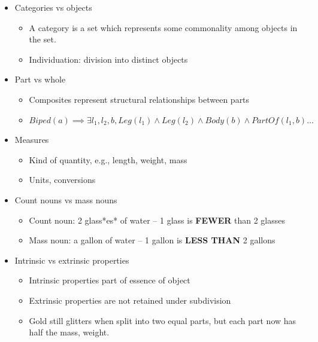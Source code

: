 \documentclass[11pt]{article}
\begin{document}
\begin{itemize}
\item Categories vs objects

\begin{itemize}
\item A category is a set which represents some commonality among objects in the set.
\item Individuation: division into distinct objects
\end{itemize}

\item Part vs whole

\begin{itemize}
\item Composites represent structural relationships between parts
\item \(Biped(a) \implies \exists l_1, l_2, b, Leg(l_1) \land Leg(l_2) \land Body(b) \land PartOf(l_1, b) \dots\)
\end{itemize}

\item Measures

\begin{itemize}
\item Kind of quantity, e.g., length, weight, mass
\item Units, conversions
\end{itemize}

\item Count nouns vs mass nouns

\begin{itemize}
\item Count noun: 2 glass*es* of water -- 1 glass is \textbf{FEWER} than 2 glasses

\item Mass noun: a gallon of water -- 1 gallon is \textbf{LESS THAN} 2 gallons
\end{itemize}

\item Intrinsic vs extrinsic properties

\begin{itemize}
\item Intrinsic properties part of essence of object
\item Extrinsic properties are not retained under subdivision
\item Gold still glitters when split into two equal parts, but each part now has half the mass, weight.
\end{itemize}
\end{itemize}
\end{document}

